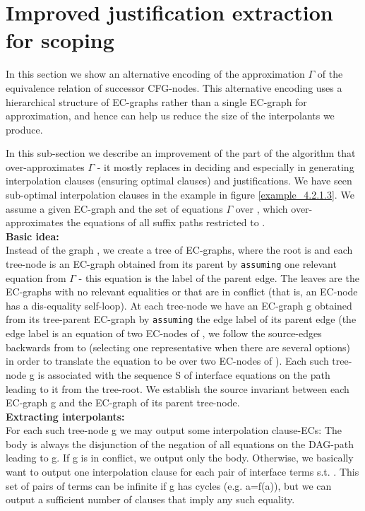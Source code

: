 \chapter{Improved justification extraction for scoping}\label{appendix:gamma_approximation}
In this section we show an alternative encoding of the approximation $\Gamma$ of the equivalence relation of successor CFG-nodes.
This alternative encoding uses a hierarchical structure of EC-graphs rather than a single EC-graph for approximation, and hence can help us reduce the size of the interpolants we produce.

In this sub-section we describe an improvement of the part of the algorithm that over-approximates $\Gamma$ - 
it mostly replaces  in deciding \eqg{} and especially in generating interpolation clauses (ensuring optimal clauses) and justifications.
We have seen sub-optimal interpolation clauses in the example in figure \ref{example_4.2.1.3}.
We assume a given EC-graph  and the set of equations $\Gamma$ over , which over-approximates the equations of all suffix paths restricted to .\\
\textbf{Basic idea:}\\
Instead of the graph , we create a tree of EC-graphs, where the root is  and each tree-node is an EC-graph obtained from its parent by \lstinline|assuming| one relevant equation from $\Gamma$ - this equation is the label of the parent edge.
The leaves are the EC-graphs with no relevant equalities or that are in conflict (that is, an EC-node has a dis-equality self-loop).
At each tree-node we have an EC-graph g obtained from its tree-parent EC-graph by \lstinline|assuming| the edge label of its parent edge (the edge label is an equation of two EC-nodes of , we follow the source-edges backwards from  to  (selecting one representative when there are several options) in order to translate the equation to be over two EC-nodes of ).
Each such tree-node g is associated with the sequence S of interface equations on the path leading to it from the tree-root.
We establish the source invariant between each EC-graph g and the EC-graph  of its parent tree-node.\\
\textbf{Extracting interpolants:}\\
For each such tree-node g we may output some interpolation clause-ECs:
The body is always the disjunction of the negation of all equations on the DAG-path leading to g.
If g is in conflict, we output only the body.
Otherwise, we basically want to output one interpolation clause for each pair of interface terms  s.t. . This set of pairs of terms can be infinite if g has cycles (e.g. a=f(a)), but we can output a sufficient number of clauses that imply any such equality.\\
